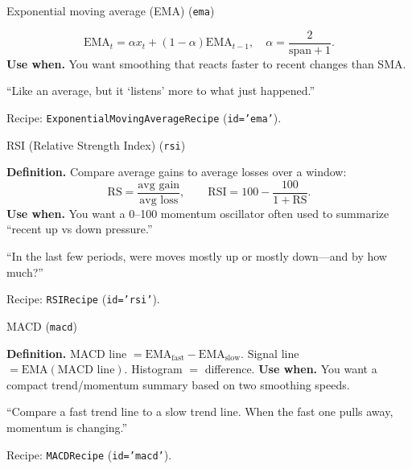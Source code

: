 \documentclass[11pt]{article}
\begin{document}
\begin{ConceptBox}{Exponential moving average (EMA) (\texttt{ema})}
\begin{ClassroomBox}
\[
\mathrm{EMA}_t = \alpha x_t + (1-\alpha)\mathrm{EMA}_{t-1}, \quad \alpha=\frac{2}{\text{span}+1}.
\]
\textbf{Use when.} You want smoothing that reacts faster to recent changes than SMA.
\end{ClassroomBox}
\begin{IntuitionBox}
“Like an average, but it ‘listens’ more to what just happened.”
\end{IntuitionBox}
\begin{WhereBox}
Recipe: \texttt{ExponentialMovingAverageRecipe} (\texttt{id='ema'}).
\end{WhereBox}
\end{ConceptBox}

\begin{ConceptBox}{RSI (Relative Strength Index) (\texttt{rsi})}
\begin{ClassroomBox}
\textbf{Definition.} Compare average gains to average losses over a window:
\[
\mathrm{RS}=\frac{\text{avg gain}}{\text{avg loss}}, \qquad \mathrm{RSI}=100-\frac{100}{1+\mathrm{RS}}.
\]
\textbf{Use when.} You want a 0–100 momentum oscillator often used to summarize “recent up vs down pressure.”
\end{ClassroomBox}
\begin{IntuitionBox}
“In the last few periods, were moves mostly up or mostly down—and by how much?”
\end{IntuitionBox}
\begin{WhereBox}
Recipe: \texttt{RSIRecipe} (\texttt{id='rsi'}).
\end{WhereBox}
\end{ConceptBox}

\begin{ConceptBox}{MACD (\texttt{macd})}
\begin{ClassroomBox}
\textbf{Definition.} MACD line \(=\mathrm{EMA}_{\text{fast}}-\mathrm{EMA}_{\text{slow}}\). Signal line \(=\mathrm{EMA}(\text{MACD line})\). Histogram \(=\) difference.
\textbf{Use when.} You want a compact trend/momentum summary based on two smoothing speeds.
\end{ClassroomBox}
\begin{IntuitionBox}
“Compare a fast trend line to a slow trend line. When the fast one pulls away, momentum is changing.”
\end{IntuitionBox}
\begin{WhereBox}
Recipe: \texttt{MACDRecipe} (\texttt{id='macd'}).
\end{WhereBox}
\end{ConceptBox}
\end{document}
